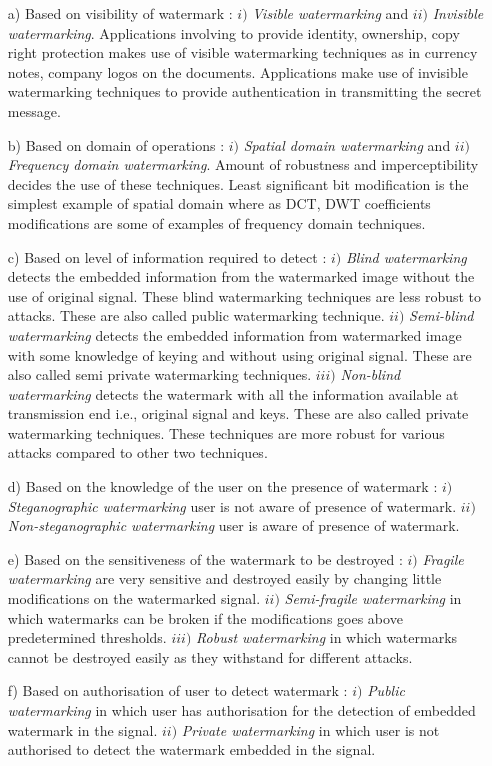 \begin{enumerate}
\item[a)] Based on visibility of watermark :  $i)$ \textit{Visible watermarking} and $ii)$ \textit{Invisible watermarking}. Applications involving to provide identity, ownership, copy right protection makes use of visible watermarking techniques as in currency notes, company logos on the documents. Applications make use of invisible watermarking techniques to provide authentication in transmitting the secret message.
\item[b)] Based on domain of operations : $i)$ \textit{Spatial domain watermarking} and $ii)$ \textit{Frequency domain watermarking}. Amount of robustness and imperceptibility decides the use of these techniques. Least significant bit modification is the simplest example of spatial domain where as DCT, DWT coefficients modifications are some of examples of frequency domain techniques.
\item[c)] Based on level of information required to detect : $i)$ \textit{Blind watermarking} detects the embedded information from the watermarked image without the use of original signal. These blind watermarking techniques are less robust to attacks. These are also called public watermarking technique. $ii)$ \textit{Semi-blind watermarking} detects the embedded information from watermarked image with some knowledge of keying and without using original signal. These are also called semi private watermarking techniques. $iii)$ \textit{Non-blind watermarking} detects the watermark with all the information available at transmission end i.e., original signal and keys. These are also called private watermarking techniques. These techniques are more robust for various attacks compared to other two techniques.
\item[d)] Based on the knowledge of the user on the presence of watermark : $i)$ \textit{Steganographic watermarking} user is not aware of presence of watermark. $ii)$ \textit{Non-steganographic watermarking} user is aware of presence of watermark.
\item[e)] Based on the sensitiveness of the watermark to be destroyed : $i)$ \textit{Fragile watermarking} are very sensitive and destroyed easily by changing little modifications on the watermarked signal. $ii)$ \textit{Semi-fragile watermarking} in which watermarks can be broken if the modifications goes above predetermined thresholds. $iii)$ \textit{Robust watermarking} in which watermarks cannot be destroyed easily as they withstand for different attacks.
\item[f)] Based on authorisation of user to detect watermark : $i)$ \textit{Public watermarking} in which user has authorisation for the detection of embedded watermark in the signal. $ii)$ \textit{Private watermarking} in which user is not authorised to detect the watermark embedded in the signal.
\end{enumerate}	
	

